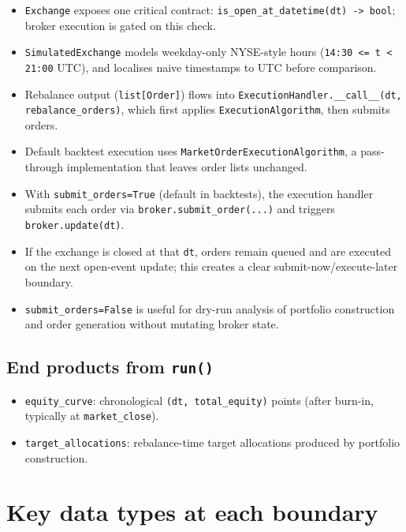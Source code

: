 \documentclass[11pt]{article}
\begin{document}
\begin{itemize}[leftmargin=*]
  \item \texttt{Exchange} exposes one critical contract: \texttt{is\_open\_at\_datetime(dt) -> bool}; broker execution is gated on this check.
  \item \texttt{SimulatedExchange} models weekday-only NYSE-style hours (\texttt{14:30 <= t < 21:00} UTC), and localises naive timestamps to UTC before comparison.
  \item Rebalance output (\texttt{list[Order]}) flows into \texttt{ExecutionHandler.\_\_call\_\_(dt, rebalance\_orders)}, which first applies \texttt{ExecutionAlgorithm}, then submits orders.
  \item Default backtest execution uses \texttt{MarketOrderExecutionAlgorithm}, a pass-through implementation that leaves order lists unchanged.
  \item With \texttt{submit\_orders=True} (default in backtests), the execution handler submits each order via \texttt{broker.submit\_order(...)} and triggers \texttt{broker.update(dt)}.
  \item If the exchange is closed at that \texttt{dt}, orders remain queued and are executed on the next open-event update; this creates a clear submit-now/execute-later boundary.
  \item \texttt{submit\_orders=False} is useful for dry-run analysis of portfolio construction and order generation without mutating broker state.
\end{itemize}

\subsection{End products from \texttt{run()}}

\begin{itemize}[leftmargin=*]
  \item \texttt{equity\_curve}: chronological \texttt{(dt, total\_equity)} points (after burn-in, typically at \texttt{market\_close}).
  \item \texttt{target\_allocations}: rebalance-time target allocations produced by portfolio construction.
\end{itemize}

\section*{Key data types at each boundary}
\end{document}
